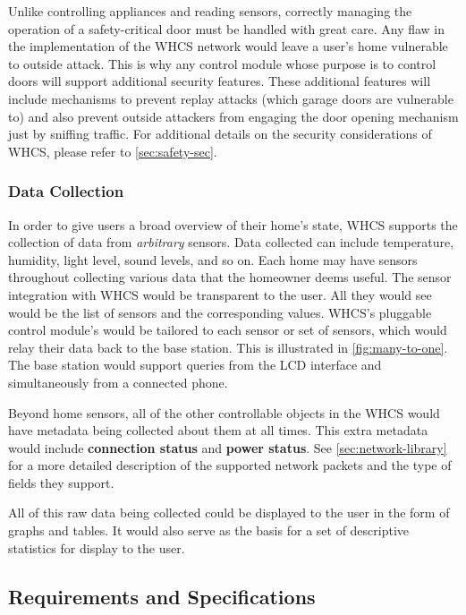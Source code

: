 Unlike controlling appliances and reading sensors, correctly managing the
operation of a safety-critical door must be handled with great care. Any flaw
in the implementation of the WHCS network would leave a user's home vulnerable
to outside attack. This is why any control module whose purpose is to control
doors will support additional security features. These additional features will
include mechanisms to prevent replay attacks (which garage doors are vulnerable
to) and also prevent outside attackers from engaging the door opening mechanism
just by sniffing traffic. For additional details on the security considerations
of WHCS, please refer to \autoref{sec:safety-sec}.

\subsubsection{Data Collection}
In order to give users a broad overview of their home's state, WHCS supports
the collection of data from \emph{arbitrary} sensors. Data collected can
include temperature, humidity, light level, sound levels, and so on. Each home
may have sensors throughout collecting various data that the homeowner deems
useful. The sensor integration with WHCS would be transparent to the user. All
they would see would be the list of sensors and the corresponding values.
WHCS's pluggable control module's would be tailored to each sensor or set of
sensors, which would relay their data back to the base station. This is
illustrated in \autoref{fig:many-to-one}. The base station would support
queries from the LCD interface and simultaneously from a connected phone.


Beyond home sensors, all of the other controllable objects in the WHCS
would have metadata being collected about them at all times. This extra metadata
would include \textbf{connection status} and \textbf{power status}. See
\autoref{sec:network-library} for a more detailed description of the supported
network packets and the type of fields they support.

All of this raw data being collected could be displayed to the user in the form
of graphs and tables. It would also serve as the basis for a set of descriptive
statistics for display to the user.

\subsection{Requirements and Specifications}

